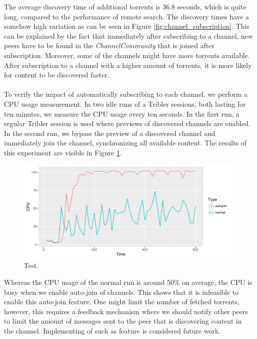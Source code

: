 The average discovery time of additional torrents is 36.8 seconds, which is quite long, compared to the performance of remote search. The discovery times have a somehow high variation as can be seen in Figure \ref{fig:channel_subscription}. This can be explained by the fact that immediately after subscribing to a channel, new peers have to be found in the \emph{ChannelCommunity} that is joined after subscription. Moreover, some of the channels might have more torrents available. After subscription to a channel with a higher amount of torrents, it is more likely for content to be discovered faster.\\\\
To verify the impact of automatically subscribing to each channel, we perform a CPU usage measurement. In two idle runs of a Tribler sessions, both lasting for ten minutes, we measure the CPU usage every ten seconds. In the first run, a regular Tribler session is used where previews of discovered channels are enabled. In the second run, we bypass the preview of a discovered channel and immediately join the channel, synchronizing all available content. The results of this experiment are visible in Figure \ref{fig:channel_subscription_cpu}.

\begin{figure}[!h]
	\centering
	\includegraphics[width=1.0\columnwidth]{images/experiments/subscribe_cpu_experiment}
	\caption{Test.}
	\label{fig:channel_subscription_cpu}
\end{figure}

Whereas the CPU usage of the normal run is around 50\% on average, the CPU is busy when we enable auto-join of channels. This shows that it is infeasible to enable this auto-join feature. One might limit the number of fetched torrents, however, this requires a feedback mechanism where we should notify other peers to limit the amount of messages sent to the peer that is discovering content in the channel. Implementing of such as feature is considered future work.

